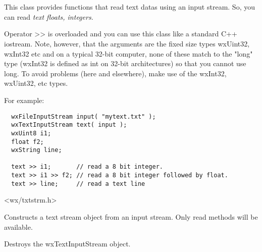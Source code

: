 \section{}\label{wxtextinputstream}

This class provides functions that read text datas using an input stream.
So, you can read \it{text} floats, integers.

Operator >> is overloaded and you can use this class like a standard C++ iostream.
Note, however, that the arguments are the fixed size types wxUint32, wxInt32 etc
and on a typical 32-bit computer, none of these match to the "long" type (wxInt32
is defined as int on 32-bit architectures) so that you cannot use long. To avoid
problems (here and elsewhere), make use of the wxInt32, wxUint32, etc types.

For example:
\begin{verbatim}
  wxFileInputStream input( "mytext.txt" );
  wxTextInputStream text( input );
  wxUint8 i1;
  float f2;
  wxString line;

  text >> i1;       // read a 8 bit integer.
  text >> i1 >> f2; // read a 8 bit integer followed by float.
  text >> line;     // read a text line
\end{verbatim}


<wx/txtstrm.h>


\label{wxtextinputstreamconstr}


Constructs a text stream object from an input stream. Only read methods will
be available.





Destroys the wxTextInputStream object.



